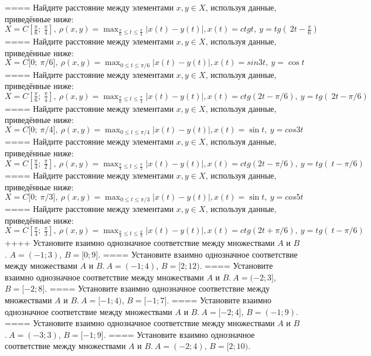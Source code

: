 ====
Найдите расстояние между элементами \(x,y \in X\), используя данные, приведённые ниже: \(X = C\left\lbrack \frac{\pi}{6};\ \frac{\pi}{4} \right\rbrack,\ \rho(x,y) = \max_{\frac{\pi}{6} \leq t \leq \frac{\pi}{4}}|x(t) - y(t)|,x(t) = ctgt,\ y = tg(\ 2t - \frac{\pi}{6})\)
====
Найдите расстояние между элементами \(x,y \in X\), используя данные, приведённые ниже: \(X = C\lbrack 0;\ \pi/6\rbrack,\ \rho(x,y) = \max_{0 \leq t \leq \pi/6}|x(t) - y(t)|,x(t) = sin3t,\ y = \cos t\)
====
Найдите расстояние между элементами \(x,y \in X\), используя данные, приведённые ниже: \(X = C\left\lbrack \frac{\pi}{6};\ \frac{\pi}{4} \right\rbrack,\ \rho(x,y) = \max_{\frac{\pi}{6} \leq t \leq \frac{\pi}{4}}|x(t) - y(t)|,x(t) = ctg(2t - \pi/6),\ y = tg(\ 2t - \pi/6)\)
====
Найдите расстояние между элементами \(x,y \in X\), используя данные, приведённые ниже: \(X = C\lbrack 0;\ \pi/4\rbrack,\ \rho(x,y) = \max_{0 \leq t \leq \pi/4}|x(t) - y(t)|,x(t) = \sin t,\ y = cos3t\)
====
Найдите расстояние между элементами \(x,y \in X\), используя данные, приведённые ниже: \(X = C\left\lbrack \frac{\pi}{4};\ \frac{\pi}{2} \right\rbrack,\ \rho(x,y) = \max_{\frac{\pi}{4} \leq t \leq \frac{\pi}{2}}|x(t) - y(t)|,x(t) = ctg(2t - \pi/6),\ y = tg(\ t - \pi/6)\ \)
====
Найдите расстояние между элементами \(x,y \in X\), используя данные, приведённые ниже: \(X = C\lbrack 0;\ \pi/3\rbrack,\ \rho(x,y) = \max_{0 \leq t \leq \pi/3}|x(t) - y(t)|,x(t) = \sin t,\ y = cos5t\)
====
Найдите расстояние между элементами \(x,y \in X\), используя данные, приведённые ниже: \(X = C\left\lbrack \frac{\pi}{4};\ \frac{\pi}{3} \right\rbrack,\ \rho(x,y) = \max_{\frac{\pi}{4} \leq t \leq \frac{\pi}{3}}|x(t) - y(t)|,x(t) = ctg(2t + \pi/6),\ y = tg(\ t - \pi/6)\)
++++
Установите взаимно однозначное соответствие между множествами \(A\) и \(B\). \(A = ( - 1;3)\), \(B = \lbrack 0;9\rbrack\).
====
Установите взаимно однозначное соответствие между множествами \(A\) и \(B\).\(\ A = ( - 1;4)\), \(B = \lbrack 2;12)\).
====
Установите взаимно однозначное соответствие между множествами \(A\) и \(B\).\(\ A = ( - 2;3\rbrack\), \(B = \lbrack - 2;8\rbrack\).
====
Установите взаимно однозначное соответствие между множествами \(A\) и \(B\).\(\ A = \lbrack - 1;4)\), \(B = \lbrack - 1;7\rbrack\).
====
Установите взаимно однозначное соответствие между множествами \(A\) и \(B\).\(\ A = \lbrack - 2;4\rbrack\), \(B = ( - 1;9)\).
====
Установите взаимно однозначное соответствие между множествами \(A\) и \(B\).\(\ A = ( - 3;3)\), \(B = \lbrack - 1;9\rbrack\).
====
Установите взаимно однозначное соответствие между множествами \(A\) и \(B\).\(\ A = ( - 2;4)\), \(B = \lbrack 2;10)\).
